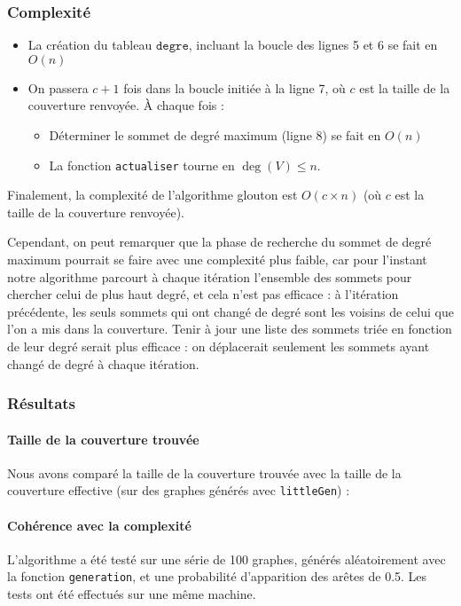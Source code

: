 \documentclass[a4paper,10pt]{article}
\newcommand*{\itemb}{\item[$\bullet$]}
\newcommand*{\itemt}{\item[$\blacktriangleright$]}
\begin{document}
\subsubsection{Complexité}

\begin{itemize}
 \itemb La création du tableau $\mathtt{degre}$, incluant la boucle des lignes 5 et 6 se fait en $O(n)$
 \itemb On passera $c+1$ fois dans la boucle initiée à la ligne 7, où $c$ est la taille de la couverture renvoyée. À chaque fois :
\begin{itemize}
\itemt Déterminer le sommet de degré maximum (ligne 8) se fait en $O(n)$
\itemt La fonction \texttt{actualiser} tourne en $\deg(V)\leqslant n$.
\end{itemize}
\end{itemize}

Finalement, la complexité de l'algorithme glouton est $O(c\times n)$ (où $c$ est la taille de la couverture renvoyée).

Cependant, on peut remarquer que la phase de recherche du sommet de degré maximum pourrait se faire avec une complexité plus faible, car pour l'instant notre algorithme parcourt à chaque itération l'ensemble des sommets pour chercher celui de plus haut degré, et cela n'est pas efficace : à l'itération précédente, les seuls sommets qui ont changé de degré sont les voisins de celui que l'on a mis dans la couverture. Tenir à jour une liste des sommets triée en fonction de leur degré serait plus efficace : on déplacerait seulement les sommets ayant changé de degré à chaque itération.

\subsubsection{Résultats}

\paragraph{Taille de la couverture trouvée}

Nous avons comparé la taille de la couverture trouvée avec la taille de la couverture effective (sur des graphes générés avec \texttt{littleGen}) :

\paragraph{Cohérence avec la complexité}
L'algorithme a été testé sur une série de 100 graphes, générés aléatoirement avec la fonction \texttt{generation}, et une probabilité d'apparition des arêtes de 0.5. 
Les tests ont été effectués sur une même machine.
\end{document}
